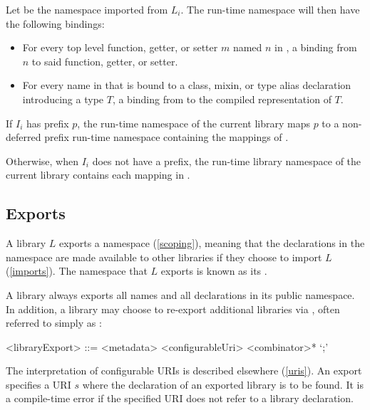 \documentclass[makeidx]{article}
\begin{document}
{\LMHash{}%
Let  be the namespace imported from $L_i$.
The run-time namespace  will then have the following bindings:

\begin{itemize}
\item
  For every top level function, getter, or setter $m$ named $n$ in
  ,
  a binding from $n$ to said function, getter, or setter.
\item
  For every name \id{} in 
  that is bound to a class, mixin, or type alias declaration
  introducing a type $T$,
  a binding from \id{} to the compiled representation of $T$.
\end{itemize}

\LMHash{}%
If $I_i$ has prefix $p$,
the run-time namespace of the current library
maps $p$ to a non-deferred prefix run-time namespace 
containing the mappings of .


\LMHash{}%
Otherwise, when $I_i$ does not have a prefix,
the run-time library namespace of the current library
contains each mapping in .
\EndCase


\subsection{Exports}

\LMHash{}%
A library $L$ exports a namespace (\ref{scoping}), meaning that
the declarations in the namespace are made available to other libraries
if they choose to import $L$ (\ref{imports}).
The namespace that $L$ exports is known as its
.

\LMHash{}%
A library always exports all names and all declarations in its public namespace.
In addition, a library may choose to re-export additional libraries
via , often referred to simply as :

\begin{grammar}
<libraryExport> ::= <metadata> \EXPORT{} <configurableUri> <combinator>* `;'
\end{grammar}

\LMHash{}%
The interpretation of configurable URIs is described elsewhere
(\ref{uris}).
An export specifies a URI $s$
where the declaration of an exported library is to be found.
It is a compile-time error if the specified URI
does not refer to a library declaration.

}
\end{document}
